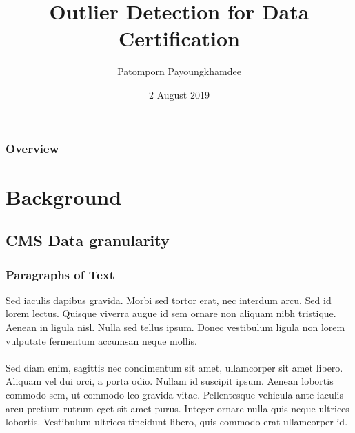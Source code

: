 \documentclass{beamer}
\title[Outlier Detection for DC]{Outlier Detection for Data Certification} %
\author{Patomporn Payoungkhamdee} %
\institute[MU] %
{
Mahidol University \\ %
\medskip
\textit{patomporn.pay@gmail.com} %
}
\date{2 August 2019} %
\begin{document}
\begin{frame}
\titlepage %
\end{frame}

\begin{frame}
\frametitle{Overview} %
\tableofcontents %
\end{frame}


\section{Background} %

\subsection{CMS Data granularity} %

\begin{frame}
\frametitle{Paragraphs of Text}
Sed iaculis dapibus gravida. Morbi sed tortor erat, nec interdum arcu. Sed id lorem lectus. Quisque viverra augue id sem ornare non aliquam nibh tristique. Aenean in ligula nisl. Nulla sed tellus ipsum. Donec vestibulum ligula non lorem vulputate fermentum accumsan neque mollis.\\~\\

Sed diam enim, sagittis nec condimentum sit amet, ullamcorper sit amet libero. Aliquam vel dui orci, a porta odio. Nullam id suscipit ipsum. Aenean lobortis commodo sem, ut commodo leo gravida vitae. Pellentesque vehicula ante iaculis arcu pretium rutrum eget sit amet purus. Integer ornare nulla quis neque ultrices lobortis. Vestibulum ultrices tincidunt libero, quis commodo erat ullamcorper id.
\end{frame}
\end{document}
